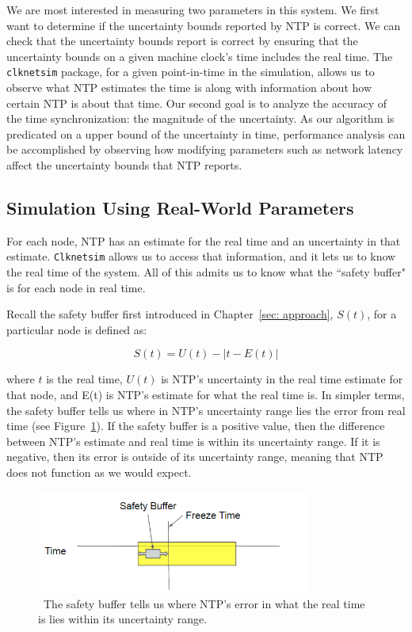 We are most interested in measuring two parameters in this system. We
first want to determine if the uncertainty bounds reported by NTP is
correct. We can check that the uncertainty bounds report is correct
by ensuring that the uncertainty bounds on a given machine clock's
time includes the real time.  The \texttt{clknetsim} package, for a
given point-in-time in the simulation, allows us to observe what NTP
estimates the time is along with information about how certain NTP is
about that time. Our second goal is to analyze the accuracy of the
time synchronization: the magnitude of the uncertainty.  As our
algorithm is predicated on a upper bound of the uncertainty in time,
performance analysis can be accomplished by observing how modifying
parameters such as network latency affect the uncertainty bounds
that NTP reports.

\subsection{Simulation Using Real-World Parameters}

For each node, NTP has an estimate for the real time and an uncertainty
in that estimate. \texttt{Clknetsim} allows us to access that information, and
it lets us to know the real time of the system. All of this admits
us to know what the ``safety buffer" is for each node in real time.

Recall the safety buffer first introduced in Chapter~\ref{sec: approach}, $S(t)$,  for a particular node is defined as:

\[ S(t) = U(t) - | t - E(t)| \]

where $t$ is the real time, $U(t)$ is NTP's uncertainty in the real
time estimate for that node, and E(t) is NTP's estimate for what the
real time is. In simpler terms, the safety buffer tells us where in NTP's
uncertainty range lies the error from real time (see
Figure~\ref{fig:safety-diag}). If the safety buffer is a positive
value, then the difference between NTP's estimate and real time is
within its uncertainty range. If it is negative, then its error is
outside of its uncertainty range, meaning that NTP does not function as
we would expect.

\begin{figure}[!htbp]
  \caption{~The safety buffer tells us where NTP's error in what the real time is lies within its uncertainty range.} 
  \label{fig:safety-diag}
  \centering
  \includegraphics[width=0.8\textwidth]{safety-diagram.png}
\end{figure}


